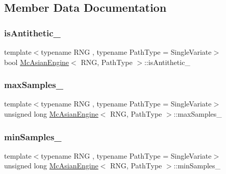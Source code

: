 \subsection{Member Data Documentation}
\hypertarget{class_mc_asian_engine_af78788fc48c368af0e677d60aee73406}{}\label{class_mc_asian_engine_af78788fc48c368af0e677d60aee73406} 
\subsubsection{\texorpdfstring{is\+Antithetic\+\_\+}{isAntithetic\_}}
{\footnotesize\ttfamily template$<$typename R\+NG , typename Path\+Type  = Single\+Variate$>$ \\
bool \hyperlink{class_mc_asian_engine}{Mc\+Asian\+Engine}$<$ R\+NG, Path\+Type $>$\+::is\+Antithetic\+\_\+\hspace{0.3cm}{\ttfamily [private]}}

\hypertarget{class_mc_asian_engine_a50979acdba848660adb3f5aeb2169699}{}\label{class_mc_asian_engine_a50979acdba848660adb3f5aeb2169699} 
\subsubsection{\texorpdfstring{max\+Samples\+\_\+}{maxSamples\_}}
{\footnotesize\ttfamily template$<$typename R\+NG , typename Path\+Type  = Single\+Variate$>$ \\
unsigned long \hyperlink{class_mc_asian_engine}{Mc\+Asian\+Engine}$<$ R\+NG, Path\+Type $>$\+::max\+Samples\+\_\+\hspace{0.3cm}{\ttfamily [private]}}

\hypertarget{class_mc_asian_engine_a648fd96c21d0cd572e6dae0a1e8aa175}{}\label{class_mc_asian_engine_a648fd96c21d0cd572e6dae0a1e8aa175} 
\subsubsection{\texorpdfstring{min\+Samples\+\_\+}{minSamples\_}}
{\footnotesize\ttfamily template$<$typename R\+NG , typename Path\+Type  = Single\+Variate$>$ \\
unsigned long \hyperlink{class_mc_asian_engine}{Mc\+Asian\+Engine}$<$ R\+NG, Path\+Type $>$\+::min\+Samples\+\_\+\hspace{0.3cm}{\ttfamily [private]}}

